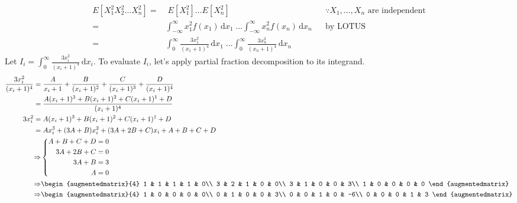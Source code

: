 \documentclass{mthe353answer}
\begin{document}
  \begin{questions}
    \setcounter{question}{1}
    \question{}
    \begin{align*}
      E[X_1^2X_2^2 \dots X_n^2] =&\; E[X_1^2] \dots E[X_n^2] && \because X_1, \dots, X_n \text{ are independent}\\
      =& \int_{-\infty}^{\infty} x_1^2 f(x_1) \, \mathrm{d}x_1\; \dots \int_{-\infty}^{\infty} x_n^2 f(x_n) \, \mathrm{d}x_n && \text{by LOTUS}\\
      =& \int_{0}^{\infty} \frac{3x_1^2}{(x_1+1)^4} \, \mathrm{d}x_1\; \dots \int_{0}^{\infty} \frac{3x_n^2}{(x_n+1)^4} \, \mathrm{d}x_n
    \end{align*}
    Let \(I_i = \int_{0}^{\infty} \frac{3x_i^2}{(x_i+1)^4} \, \mathrm{d}x_i\).
    To evaluate \(I_i\), let's apply partial fraction decomposition to its
    integrand.
    \begin{align*}
      \frac{3x_i^2}{(x_i+1)^4} =&\; \frac{A}{x_i+1} + \frac{B}{(x_i+1)^2} + \frac{C}{(x_i+1)^3} + \frac{D}{(x_i+1)^4}\\
      =&\; \frac{A(x_i+1)^3 + B(x_i+1)^2 + C(x_i+1)^1 + D}{(x_i+1)^4}\\
      3x_i^2 =&\; A(x_i+1)^3 + B(x_i+1)^2 + C(x_i+1)^1 + D\\
      =&\; Ax_i^3 + (3A + B)x_i^2 + (3A + 2B + C)x_i + A + B + C + D\\
      \Rightarrow& \left\{
        \begin{aligned}
          A + B + C + D =&\; 0\\
          3A + 2B + C =&\; 0\\
          3A + B =&\; 3\\
          A =&\; 0
        \end{aligned}
      \right.\\
      \Rightarrow& \begin{augmentedmatrix}{4}
        1 & 1 & 1 & 1 & 0\\
        3 & 2 & 1 & 0 & 0\\
        3 & 1 & 0 & 0 & 3\\
        1 & 0 & 0 & 0 & 0
      \end{augmentedmatrix}\\
      \Rightarrow& \begin{augmentedmatrix}{4}
        1 & 0 & 0 & 0 & 0\\
        0 & 1 & 0 & 0 & 3\\
        0 & 0 & 1 & 0 & -6\\
        0 & 0 & 0 & 1 & 3
      \end{augmentedmatrix}\\

\end{align*}
\end{questions}
\end{document}
